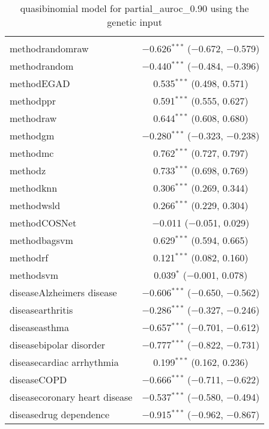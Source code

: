
\begin{table}[!htbp] \centering 
  \caption{quasibinomial model for partial_auroc_0.90 using the genetic input} 
  \label{} 
\begin{tabular}{@{\extracolsep{5pt}}lc} 
\\[-1.8ex]\hline 
\hline \\[-1.8ex] 
 methodrandomraw & $-$0.626$^{***}$ ($-$0.672, $-$0.579) \\ 
  methodrandom & $-$0.440$^{***}$ ($-$0.484, $-$0.396) \\ 
  methodEGAD & 0.535$^{***}$ (0.498, 0.571) \\ 
  methodppr & 0.591$^{***}$ (0.555, 0.627) \\ 
  methodraw & 0.644$^{***}$ (0.608, 0.680) \\ 
  methodgm & $-$0.280$^{***}$ ($-$0.323, $-$0.238) \\ 
  methodmc & 0.762$^{***}$ (0.727, 0.797) \\ 
  methodz & 0.733$^{***}$ (0.698, 0.769) \\ 
  methodknn & 0.306$^{***}$ (0.269, 0.344) \\ 
  methodwsld & 0.266$^{***}$ (0.229, 0.304) \\ 
  methodCOSNet & $-$0.011 ($-$0.051, 0.029) \\ 
  methodbagsvm & 0.629$^{***}$ (0.594, 0.665) \\ 
  methodrf & 0.121$^{***}$ (0.082, 0.160) \\ 
  methodsvm & 0.039$^{*}$ ($-$0.001, 0.078) \\ 
  diseaseAlzheimers disease & $-$0.606$^{***}$ ($-$0.650, $-$0.562) \\ 
  diseasearthritis & $-$0.286$^{***}$ ($-$0.327, $-$0.246) \\ 
  diseaseasthma & $-$0.657$^{***}$ ($-$0.701, $-$0.612) \\ 
  diseasebipolar disorder & $-$0.777$^{***}$ ($-$0.822, $-$0.731) \\ 
  diseasecardiac arrhythmia & 0.199$^{***}$ (0.162, 0.236) \\ 
  diseaseCOPD & $-$0.666$^{***}$ ($-$0.711, $-$0.622) \\ 
  diseasecoronary heart disease & $-$0.537$^{***}$ ($-$0.580, $-$0.494) \\ 
  diseasedrug dependence & $-$0.915$^{***}$ ($-$0.962, $-$0.867) \\ 

\end{tabular}
\end{table}

